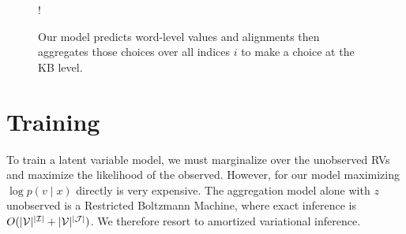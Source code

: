 \documentclass[12pt]{article}
\begin{document}
\begin{figure}[h]
\begin{center}
\resizebox {.3\columnwidth} {!} {
} %
\end{center}
\caption{Our model predicts word-level values and alignments
then aggregates those choices over all indices $i$ to
make a choice at the KB level.
}
\label{fig:infmodel}
\end{figure}

\section{Training}
To train a latent variable model, we must marginalize over the unobserved RVs
and maximize the likelihood of the observed.
However, for our model maximizing $\log p(v \mid x)$ directly is very expensive.
The aggregation model alone with $z$ unobserved is a Restricted Boltzmann Machine,
where exact inference is $O(|\mathcal{V}|^{|\mathcal{I}|} + |\mathcal{V}|^{|\mathcal{J}|})$.
We therefore resort to amortized variational inference.
\end{document}
